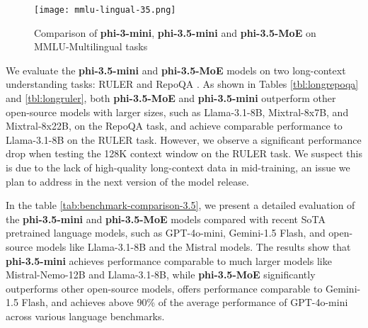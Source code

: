 \begin{figure}[h]
    \centering
    \texttt{[image: mmlu-lingual-35.png]}
    \caption{Comparison of \textbf{phi-3-mini}, \textbf{phi-3.5-mini} and \textbf{phi-3.5-MoE} on MMLU-Multilingual tasks }
    \label{fig:ml_moe}
\end{figure}

We evaluate the \textbf{phi-3.5-mini} and \textbf{phi-3.5-MoE} models on two long-context understanding tasks: RULER \cite{hsieh2024rulerwhatsrealcontext} and RepoQA \cite{liu2024repoqaevaluatinglongcontext}. As shown in Tables \ref{tbl:longrepoqa} and \ref{tbl:longruler}, both \textbf{phi-3.5-MoE} and \textbf{phi-3.5-mini} outperform other open-source models with larger sizes, such as Llama-3.1-8B, Mixtral-8x7B, and Mixtral-8x22B, on the RepoQA task, and achieve comparable performance to Llama-3.1-8B on the RULER task. However, we observe a significant performance drop when testing the 128K context window on the RULER task. We suspect this is due to the lack of high-quality long-context data in mid-training, an issue we plan to address in the next version of the model release.  

 In the table \ref{tab:benchmark-comparison-3.5}, we present a detailed evaluation of the \textbf{phi-3.5-mini} and \textbf{phi-3.5-MoE} models compared with recent SoTA pretrained language models, such as GPT-4o-mini, Gemini-1.5 Flash, and open-source models like Llama-3.1-8B and the Mistral models. The results show that \textbf{phi-3.5-mini} achieves performance comparable to much larger models like Mistral-Nemo-12B and Llama-3.1-8B, while \textbf{phi-3.5-MoE} significantly outperforms other open-source models, offers performance comparable to Gemini-1.5 Flash, and achieves above 90\% of the average performance of GPT-4o-mini across various language benchmarks.

